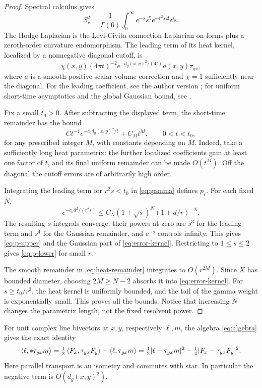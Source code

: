 \begin{proof}
Spectral calculus gives
\begin{equation}\label{eq:gamma}
S_r^2=\frac1{\Gamma(6)}
\int_0^\infty e^{-s}s^5e^{-r^2s\Delta}\dd s.
\end{equation}
The Hodge Laplacian is the Levi-Civita connection Laplacian
on forms plus a zeroth-order curvature endomorphism.
The leading term of its heat kernel, localized by a
nonnegative diagonal cutoff, is
\[
\chi(x,y)(4\pi t)^{-2}e^{-d_g(x,y)^2/(4t)}
a(x,y)\tau_{yx},
\]
where \(a\) is a smooth positive scalar volume correction
and \(\chi=1\) sufficiently near the diagonal.
For the leading coefficient, see the author version
\cite[Section~3, equation~(3.4)]{Ludewig2018}; for
uniform short-time asymptotics and the global Gaussian bound,
see \cite[Theorems~1.1 and~3.5]{Ludewig2019}.

Fix a small \(t_0>0\). After subtracting the displayed term,
the short-time remainder has the bound
\begin{equation}\label{eq:heat-remainder}
Ct^{-1}e^{-c_0d_g(x,y)^2/t}+C_Mt^M,\qquad 0<t<t_0,
\end{equation}
for any prescribed integer \(M\), with constants depending
on \(M\). Indeed, take a sufficiently long heat parametrix:
the further localized coefficients gain at least one factor
of \(t\), and its final uniform remainder can be made
\(O(t^M)\). Off the diagonal the cutoff errors are of
arbitrarily high order.

Integrating the leading term for \(r^2s<t_0\) in
\eqref{eq:gamma} defines \(p_r\). For each fixed \(N\),
\[
e^{-c_0d^2/(r^2s)}
\le C_N(1+\sqrt{s})^N(1+d/r)^{-N}.
\]
The resulting \(s\)-integrals converge: their powers at zero
are \(s^3\) for the leading term and \(s^4\) for the Gaussian
remainder, and \(e^{-s}\) controls infinity. This gives
\eqref{eq:p-upper} and the Gaussian part of
\eqref{eq:error-kernel}. Restricting to \(1\le s\le2\)
gives \eqref{eq:p-lower} for small \(r\).

The smooth remainder in \eqref{eq:heat-remainder} integrates
to \(O(r^{2M})\). Since \(X\) has bounded diameter, choosing
\(2M\ge N-2\) absorbs it into \eqref{eq:error-kernel}.
For \(s\ge t_0/r^2\), the heat kernel is uniformly bounded,
and the tail of the gamma weight is exponentially small.
This proves all the bounds. Notice that increasing \(N\)
changes the parametrix length, not the fixed resolvent
power.
\end{proof}

For unit complex line bivectors at \(x,y\), respectively
\(\ell,m\), the algebra \eqref{eq:algebra} gives the exact
identity
\begin{equation}\label{eq:angular-identity}
\left\langle \ell,*\tau_{yx}m\right\rangle
=\tfrac12\left\langle F_x,\tau_{yx}F_y\right\rangle-\left\langle \ell,\tau_{yx}m\right\rangle
=\tfrac12|\ell-\tau_{yx}m|^2
 -\tfrac14|F_x-\tau_{yx}F_y|^2.
\end{equation}
Here parallel transport is an isometry and commutes with star.
In particular the negative term is \(O(d_g(x,y)^2)\).


